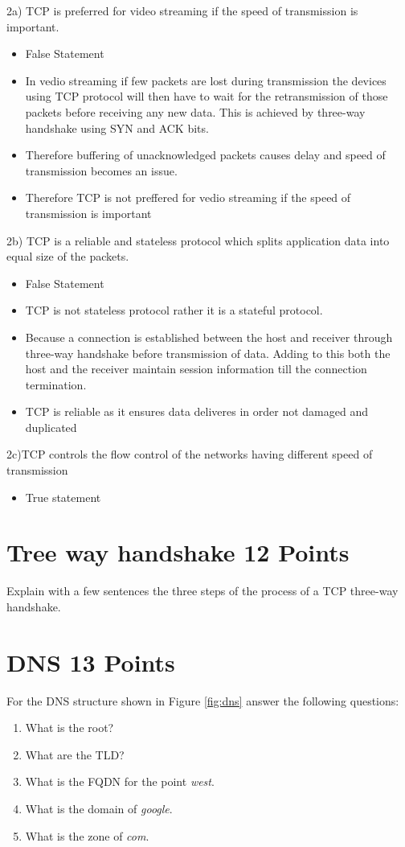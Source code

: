 \documentclass{resources/WeSTassignment}
\begin{document}
2a) TCP is preferred for video streaming if the speed of transmission is important.
			\begin{itemize}
			\item False Statement
			\item In vedio streaming if few packets are lost during transmission the devices using TCP protocol will then have to wait for the retransmission of those packets before receiving any new data. This is achieved by three-way handshake using SYN and ACK bits.
			\item Therefore buffering of unacknowledged packets causes delay and speed of transmission becomes an issue.
			\item Therefore TCP is not preffered for vedio streaming if the speed of transmission is important
			\end{itemize}
2b) TCP is a reliable and stateless protocol which splits application data into equal
size of the packets.
			\begin{itemize}
			\item False Statement
			\item TCP is not stateless protocol rather it is a stateful protocol.
			\item Because a connection is established between the host and receiver through three-way handshake before transmission of data. Adding to this both the host and the receiver maintain session information till the connection termination.
			\item TCP is reliable as it ensures data deliveres in order not damaged and duplicated 
			\end{itemize}
2c)TCP controls the flow control of the networks having different speed of transmission 
			\begin{itemize}
			\item True statement
			\end{itemize}




\section{Tree way handshake \hfill{12 Points}}
Explain with a few sentences the three steps of the process of a TCP three-way handshake.

\section{DNS \hfill{13 Points}}
For the DNS structure shown in Figure \ref{fig:dns} answer the following questions:
\begin{enumerate}
    \item What is the root?
    \item What are the TLD?
    \item What is the FQDN for the point \emph{west}.
    \item What is the domain of \emph{google}.
    \item What is the zone of \emph{com}.
\end{enumerate}
\end{document}
